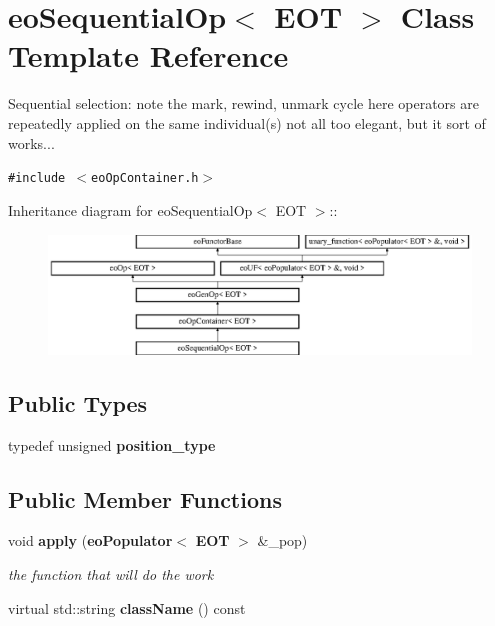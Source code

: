 \section{eo\-Sequential\-Op$<$ EOT $>$ Class Template Reference}
\label{classeo_sequential_op}
Sequential selection: note the mark, rewind, unmark cycle here operators are repeatedly applied on the same individual(s) not all too elegant, but it sort of works...  


{\tt \#include $<$eo\-Op\-Container.h$>$}

Inheritance diagram for eo\-Sequential\-Op$<$ EOT $>$::\begin{figure}[H]
\begin{center}
\leavevmode
\includegraphics[height=3.18544cm]{classeo_sequential_op}
\end{center}
\end{figure}
\subsection*{Public Types}
\begin{CompactItemize}
\item 
typedef unsigned {\bf position\_\-type}\label{classeo_sequential_op_w0}

\end{CompactItemize}
\subsection*{Public Member Functions}
\begin{CompactItemize}
\item 
void {\bf apply} ({\bf eo\-Populator}$<$ {\bf EOT} $>$ \&\_\-pop)\label{classeo_sequential_op_a0}

\begin{CompactList}\small\item\em the function that will do the work \item\end{CompactList}\item 
virtual std::string {\bf class\-Name} () const \label{classeo_sequential_op_a1}

\end{CompactItemize}
